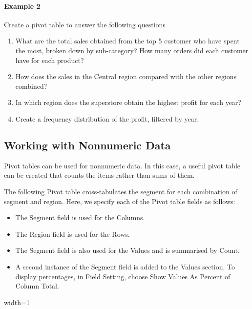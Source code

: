 \documentclass[
]{article}
\theoremstyle{definition}
\theoremstyle{definition}
\theoremstyle{definition}
\theoremstyle{definition}
\theoremstyle{remark}
\begin{document}
\hypertarget{example-2}{%
\paragraph*{Example 2}\label{example-2}}

Create a pivot table to answer the following questions

\begin{enumerate}
\def\labelenumi{\arabic{enumi}.}
\item
  What are the total sales obtained from the top 5 customer who have
  spent the most, broken down by sub-category? How many orders did
  each customer have for each product?
\item
  How does the sales in the Central region compared with the other
  regions combined?
\item
  In which region does the superstore obtain the highest profit for
  each year?
\item
  Create a frequency distribution of the profit, filtered by year.
\end{enumerate}

\hypertarget{working-with-nonnumeric-data}{%
\subsection{Working with Nonnumeric Data}\label{working-with-nonnumeric-data}}

Pivot tables can be used for nonnumeric data. In this case, a useful
pivot table can be created that counts the items rather than sums of
them.

The following Pivot table cross-tabulates the segment for each
combination of segment and region. Here, we specify each of the Pivot
table fields as follows:

\begin{itemize}
\item
  The Segment field is used for the Columns.
\item
  The Region field is used for the Rows.
\item
  The Segment field is also used for the Values and is summarised by
  Count.
\item
  A second instance of the Segment field is added to the Values
  section. To display percentages, in Field Setting, choose Show
  Values As Percent of Column Total.
\end{itemize}

width=1
\end{document}
